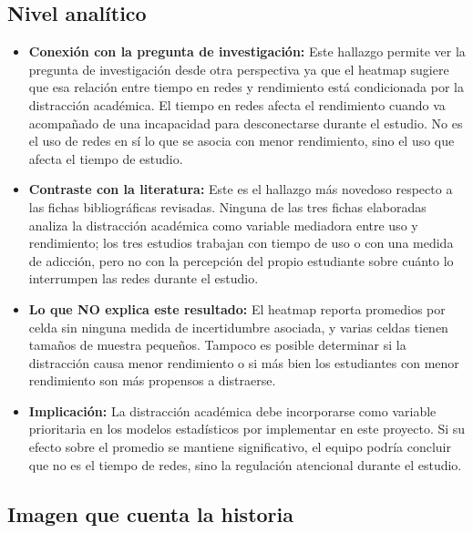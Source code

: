 \documentclass[12pt]{article}
\begin{document}
\subsection*{Nivel analítico}
\begin{itemize}
    \item \textbf{Conexión con la pregunta de investigación:} Este hallazgo permite ver la pregunta de investigación desde otra perspectiva ya que el heatmap sugiere que esa relación entre tiempo en redes y rendimiento está condicionada por la distracción académica. El tiempo en redes afecta el rendimiento cuando va acompañado de una incapacidad para desconectarse durante el estudio. No es el uso de redes en sí lo que se asocia con menor rendimiento, sino el uso que afecta el tiempo de estudio.
    \item \textbf{Contraste con la literatura: } Este es el hallazgo más novedoso respecto a las fichas bibliográficas revisadas. Ninguna de las tres fichas elaboradas analiza la distracción académica como variable mediadora entre uso y rendimiento; los tres estudios trabajan con tiempo de uso o con una medida de adicción, pero no con la percepción del propio estudiante sobre cuánto lo interrumpen las redes durante el estudio. 
    \item \textbf{Lo que NO explica este resultado: } El heatmap reporta promedios por celda sin ninguna medida de incertidumbre asociada, y varias celdas tienen tamaños de muestra pequeños. Tampoco es posible determinar si la distracción causa menor rendimiento o si más bien los estudiantes con menor rendimiento son más propensos a distraerse. 
    \item \textbf{Implicación:} La distracción académica debe incorporarse como variable prioritaria en los modelos estadísticos por implementar en este proyecto. Si su efecto sobre el promedio se mantiene significativo, el equipo podría concluir que no es el tiempo de redes, sino la regulación atencional durante el estudio. 
\end{itemize}

\subsection{Imagen que cuenta la historia}
\end{document}
